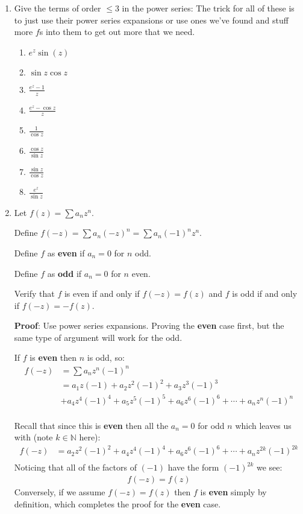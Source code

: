 \begin{enumerate}

    \item Give the terms of order $\leq 3$ in the power series:
    The trick for all of these is to just use their power series expansions or use ones we've found and stuff more $f$s into them 
    to get out more that we need.
    \begin{enumerate}
      \item $e^z \sin(z)$
      \item $\sin z \cos z$
      \item $\frac{e^z - 1}{z}$
      \item $\frac{e^z - \cos z}{z}$
      \item $\frac{1}{\cos z}$
      \item $\frac{\cos z}{\sin z}$
      \item $\frac{\sin z}{\cos z}$
      \item $\frac{e^z}{\sin z}$
    \end{enumerate}
    
    \item Let $f(z) = \sum a_n z^n$.
  
    Define $f(-z) = \sum a_n (-z)^n = \sum a_n(-1)^n z^n$.
  
    Define $f$ as \textbf{even} if $a_n = 0$ for $n$ odd.
  
    Define $f$ as \textbf{odd} if $a_n = 0$ for $n$ even.
  
    Verify that $f$ is even if and only if $f(-z) = f(z)$ and $f$ is odd if and only if $f(-z) = -f(z).$
  
    \textbf{Proof}:
    Use power series expansions. Proving the \textbf{even} case first, but the same type of argument will work for the odd.
  
    If $f$ is \textbf{even} then $n$ is odd, so:
    \begin{align*}
      f(-z) &= \sum a_n z^n (-1)^n \\
      &= a_1 z (-1) + a_2 z^2 (-1)^2 + a_3 z^3 (-1)^3 \\
      &+ a_4 z^4 (-1)^4 + a_5 z^5 (-1)^5 + a_6 z^6 (-1)^6 + \cdots + a_n z^n (-1)^n \\
    \end{align*}
  
    Recall that since this is \textbf{even} then all the $a_n = 0$ for odd $n$ which leaves us with (note $k \in \mathbb{N}$ here):
    \begin{align*}
      f(-z) &= a_2 z^2 (-1)^2 + a_4 z^4 (-1)^4 + a_6 z^6 (-1)^6 + \cdots + a_n z^{2k} (-1)^{2k} \\
    \end{align*} 
    Noticing that all of the factors of $(-1)$ have the form $(-1)^{2k}$ we see:
    \begin{align*}
      f(-z) = f(z)
    \end{align*}
    Conversely, if we assume $f(-z) = f(z)$ then $f$ is \textbf{even} simply by definition, which completes the proof 
    for the \textbf{even} case. 
    

\end{enumerate}
